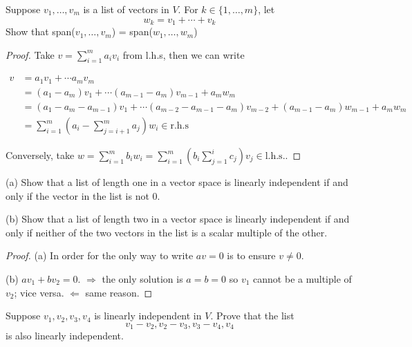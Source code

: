 \documentclass{extarticle}
\begin{document}
\begin{problem}{3}
    Suppose \(v_1, \ldots, v_m\) is a list of vectors in \(V\). 
    For \(k \in \{1, \ldots, m\}\), let 
    \[w_k = v_1 + \cdots + v_k\]
    Show that span(\(v_1, \ldots, v_m\)) = span(\(w_1, \ldots, w_m\))
\end{problem}

\begin{proof}
Take \(v = \sum_{i=1}^m a_i v_i\) from l.h.s, then we can write 

\begin{align*}
    v 
    &= a_1 v_1 + \cdots a_m v_m \\ 
    &= (a_1 - a_m) v_1 +\cdots (a_{m-1} - a_{m}) v_{m-1} + a_m w_m \\ 
    &= (a_1 - a_m - a_{m-1}) v_1 + \cdots (a_{m - 2} - a_{m-1} - a_m) v_{m-2}
    +(a_{m-1} - a_m) w_{m-1}  + a_m w_m \\ 
    &= \sum_{i=1}^m (a_i - \sum_{j=i+1}^m a_j)w_i \in \text{r.h.s}
\end{align*}

Conversely, take \(w = \sum_{i=1}^m b_i w_i = \sum_{i=1}^m (b_i \sum_{j=1}^i c_j) v_j \in \text{l.h.s.}\).

\end{proof}

\begin{problem}{4}
    (a) Show that a list of length one in a vector space is linearly independent 
    if and only if the vector in the list is not 0. 
    
    (b) Show that a list of length two in a vector space is linearly independent 
    if and only if neither of the two vectors in the list is a scalar multiple of 
    the other.
\end{problem}

\begin{proof}
(a) In order for the only way to write \(a v = 0\) is to ensure \(v \neq 0\). 

(b) \(a v_1 + b v_2 = 0\). \(\Rightarrow\) the only solution is \(a=b=0\) so \(v_1\)
cannot be a multiple of \(v_2\); vice versa.  \(\Leftarrow\) same reason.
\end{proof}


\begin{problem}{8}
    Suppose \(v_1, v_2, v_3, v_4\) is linearly independent in \(V\). Prove that the list 
    \[v_1 - v_2, v_2 - v_3, v_3 - v_4 , v_4\]
    is also linearly independent. 
\end{problem}
\end{document}
